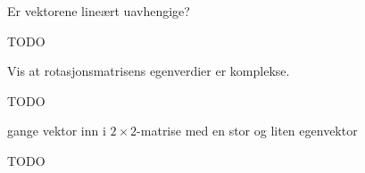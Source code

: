 
\begin{oppgave}
Er vektorene lineært uavhengige?
\end{oppgave}

\begin{losning}
TODO
\end{losning}


\begin{oppgave}
Vis at rotasjonsmatrisens egenverdier er komplekse.
\end{oppgave}

\begin{losning}
TODO
\end{losning}


\begin{oppgave}
gange vektor inn i $2 \times 2$-matrise med en stor og liten egenvektor
\end{oppgave}

\begin{losning}
TODO
\end{losning}


